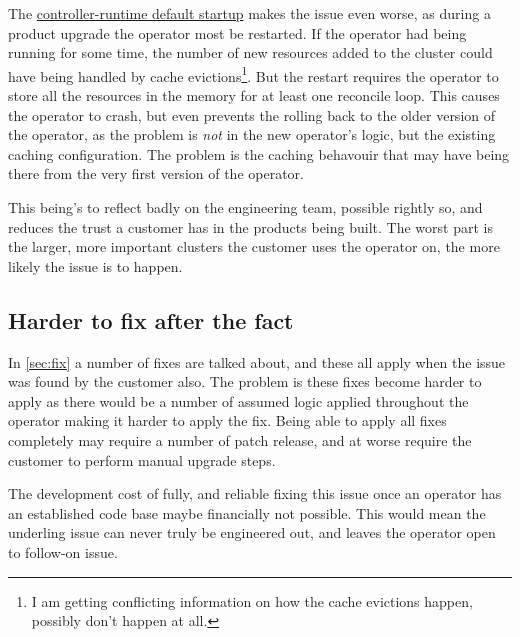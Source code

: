 The \hyperref[sec:why:controller-runtime:startup]{controller-runtime default startup} makes the issue even worse, as during a product upgrade the operator most be restarted.
If the operator had being running for some time, the number of new resources added to the cluster could have being handled by cache evictions\footnote{I am getting conflicting information on how the cache evictions happen, possibly don't happen at all.}.
But the restart requires the operator to store all the resources in the memory for at least one reconcile loop.
This causes the operator to crash, but even prevents the rolling back to the older version of the operator, as the problem is \textit{not} in the new operator's logic, but the existing caching configuration.
The problem is the caching behavouir that may have being there from the very first version of the operator.

This being's to reflect badly on the engineering team, possible rightly so, and reduces the trust a customer has in the products being built.
The worst part is the larger, more important clusters the customer uses the operator on, the more likely the issue is to happen.

\subsection{Harder to fix after the fact}
In \cref{sec:fix} a number of fixes are talked about, and these all apply when the issue was found by the customer also.
The problem is these fixes become harder to apply as there would be a number of assumed logic applied throughout the operator making it harder to apply the fix.
Being able to apply all fixes completely may require a number of patch release, and at worse require the customer to perform manual upgrade steps.

The development cost of fully, and reliable fixing this issue once an operator has an established code base maybe financially not possible.
This would mean the underling issue can never truly be engineered out, and leaves the operator open to follow-on issue.
